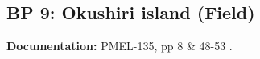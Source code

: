 \newsection

\subsection{BP 9:
 Okushiri island (Field)}

{\bf Documentation:}  PMEL-135, pp 8 \& 48-53
\cite{SynolakisBernard:pmel135}.
